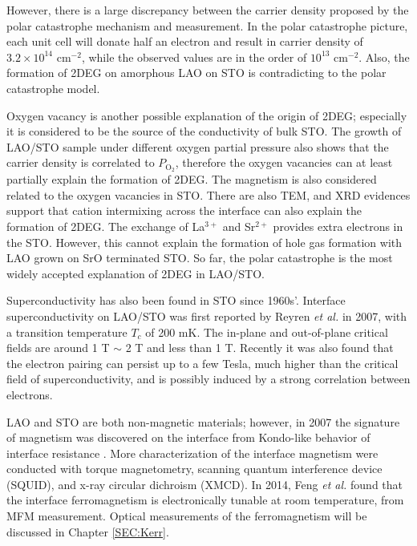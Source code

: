 \documentclass[pdflatex, sectionletters, 12pt, final, phd]{pittetd}    %
\begin{document}
However, there is a large discrepancy between the carrier density proposed by the polar catastrophe mechanism and measurement. In the polar catastrophe picture, each unit cell will donate half an electron and result in carrier density of $3.2 \times 10^{14}$ cm$^{-2}$, while the observed values are in the order of $10^{13}$ cm$^{-2}$. Also, the formation of 2DEG on amorphous LAO on STO is contradicting to the polar catastrophe model. 

Oxygen vacancy is another possible explanation of the origin of 2DEG\cite{kalabukhov2007effect}; especially it is considered to be the source of the conductivity of bulk STO\cite{schooley1965dependence}. The growth of LAO/STO sample under different oxygen partial pressure also shows that the carrier density is correlated to $P_{\mathrm{O_2}}$, therefore the oxygen vacancies can at least partially explain the formation of 2DEG. The magnetism is also considered related to the oxygen vacancies in STO. There are also TEM\cite{nakagawa2006some}, and XRD\cite{willmott2007structural} evidences support that cation intermixing across the interface can also explain the formation of 2DEG. The exchange of La$^{3+}$ and Sr$^{2+}$ provides extra electrons in the STO. However, this cannot explain the formation of hole gas formation with LAO grown on SrO terminated STO. So far, the polar catastrophe is the most widely accepted explanation of 2DEG in LAO/STO.

Superconductivity has also been found in STO since 1960s'\cite{schooley1964superconductivity}. Interface superconductivity on LAO/STO was first reported by Reyren \textit{et al.} in 2007\cite{reyren2007superconducting}, with a transition temperature $T_c$ of 200 mK. The in-plane and out-of-plane critical fields are around 1 T $\sim$ 2 T and less than 1 T. Recently it was also found that the electron pairing can persist up to a few Tesla, much higher than the critical field of superconductivity, and is possibly induced by a strong correlation between electrons\cite{cheng2015electron, cheng2016tunable}.

LAO and STO are both non-magnetic materials; however, in 2007 the signature of magnetism was discovered on the interface from Kondo-like behavior of interface resistance \cite{brinkman2007magnetic}. More characterization of the interface magnetism were conducted with torque magnetometry\cite{li2011coexistence}, scanning quantum interference device (SQUID)\cite{bert2011direct}, and x-ray circular dichroism (XMCD)\cite{lee2013titanium}. In 2014, Feng \textit{et al.} found that the interface ferromagnetism is electronically tunable at room temperature, from MFM measurement\cite{bi2014room}. Optical measurements of the ferromagnetism will be discussed in Chapter \ref{SEC:Kerr}.
\end{document}
